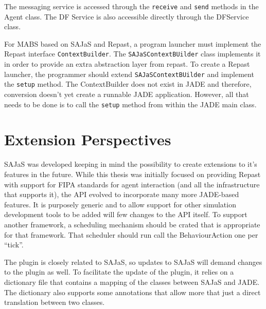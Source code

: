 The messaging service is accessed through the \texttt{receive} and \texttt{send} methods in the Agent class. The DF Service is also accessible directly through the DFService class.

For MABS based on SAJaS and Repast, a program launcher must implement the Repast interface \texttt{ContextBuilder}. The \texttt{SAJaSContextBUilder} class implements it in order to provide an extra abstraction layer from repast. To create a Repast launcher, the programmer should extend \texttt{SAJaSContextBUilder} and implement the \texttt{setup} method. The ContextBuilder does not exist in JADE and therefore, conversion doesn't yet create a runnable JADE application. However, all that needs to be done is to call the \texttt{setup} method from within the JADE main class.


\section{Extension Perspectives}

SAJaS was developed keeping in mind the possibility to create extensions to it's features in the future. While this thesis was initially focused on providing Repast with support for FIPA standards for agent interaction (and all the infrastructure that supports it), the API evolved to incorporate many more JADE-based features. It is purposely generic and to allow support for other simulation development tools to be added will few changes to the API itself. To support another framework, a scheduling mechanism should be crated that is appropriate for that framework. That scheduler should run call the BehaviourAction one per ``tick''.

The plugin is closely related to SAJaS, so updates to SAJaS will demand changes to the plugin as well. To facilitate the update of the plugin, it relies on a dictionary file that contains a mapping of the classes between SAJaS and JADE. The dictionary also supports some annotations that allow more that just a direct translation between two classes.




